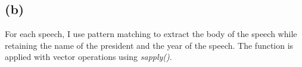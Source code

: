 \documentclass{article}
\begin{document}


\subsection*{(b)}

For each speech, I use pattern matching to extract the body of the speech while retaining 
the name of the president and the year of the speech. The function is applied with vector
operations using \textit{sapply()}.
\end{document}
